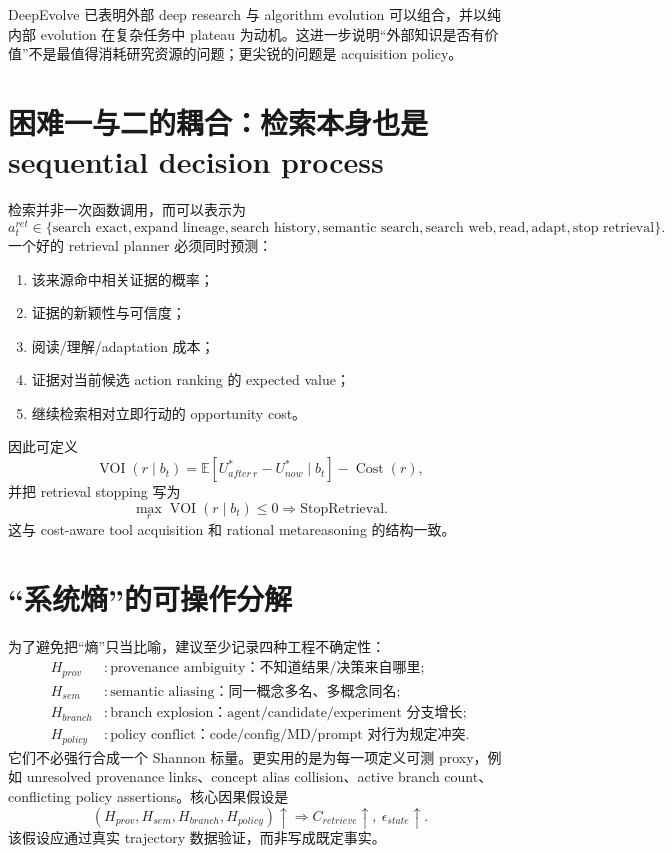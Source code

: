 \documentclass[11pt,a4paper]{ctexart}
\newcommand{\E}{\mathbb{E}}
\newcommand{\Cost}{\operatorname{Cost}}
\newcommand{\VOI}{\operatorname{VOI}}
\begin{document}
DeepEvolve 已表明外部 deep research 与 algorithm evolution 可以组合，并以纯内部 evolution 在复杂任务中 plateau 为动机\parencite{liu2025deepevolve}。这进一步说明“外部知识是否有价值”不是最值得消耗研究资源的问题；更尖锐的问题是 acquisition policy。

\section{困难一与二的耦合：检索本身也是 sequential decision process}

检索并非一次函数调用，而可以表示为
\begin{equation}
 a_t^{ret}\in\{\text{search exact},\text{expand lineage},\text{search history},\text{semantic search},\text{search web},\text{read},\text{adapt},\text{stop retrieval}\}.
\end{equation}
一个好的 retrieval planner 必须同时预测：
\begin{enumerate}
\item 该来源命中相关证据的概率；
\item 证据的新颖性与可信度；
\item 阅读/理解/adaptation 成本；
\item 证据对当前候选 action ranking 的 expected value；
\item 继续检索相对立即行动的 opportunity cost。
\end{enumerate}

因此可定义
\begin{equation}
 \VOI(r\mid b_t)=\E[U^*_{after\ r}-U^*_{now}\mid b_t]-\Cost(r),
\end{equation}
并把 retrieval stopping 写为
\begin{equation}
 \max_r\VOI(r\mid b_t)\le 0\Rightarrow \text{StopRetrieval}.
\end{equation}
这与 cost-aware tool acquisition 和 rational metareasoning 的结构一致\parencite{feng2026camdf,russell1991metareasoning}。

\section{“系统熵”的可操作分解}

为了避免把“熵”只当比喻，建议至少记录四种工程不确定性：
\begin{align}
H_{prov} &: \text{provenance ambiguity：不知道结果/决策来自哪里};\\
H_{sem} &: \text{semantic aliasing：同一概念多名、多概念同名};\\
H_{branch} &: \text{branch explosion：agent/candidate/experiment 分支增长};\\
H_{policy} &: \text{policy conflict：code/config/MD/prompt 对行为规定冲突}.
\end{align}
它们不必强行合成一个 Shannon 标量。更实用的是为每一项定义可测 proxy，例如 unresolved provenance links、concept alias collision、active branch count、conflicting policy assertions。核心因果假设是
\begin{equation}
(H_{prov},H_{sem},H_{branch},H_{policy})\uparrow
\Rightarrow C_{retrieve}\uparrow,\ \epsilon_{state}\uparrow.
\end{equation}
该假设应通过真实 trajectory 数据验证，而非写成既定事实。
\end{document}

